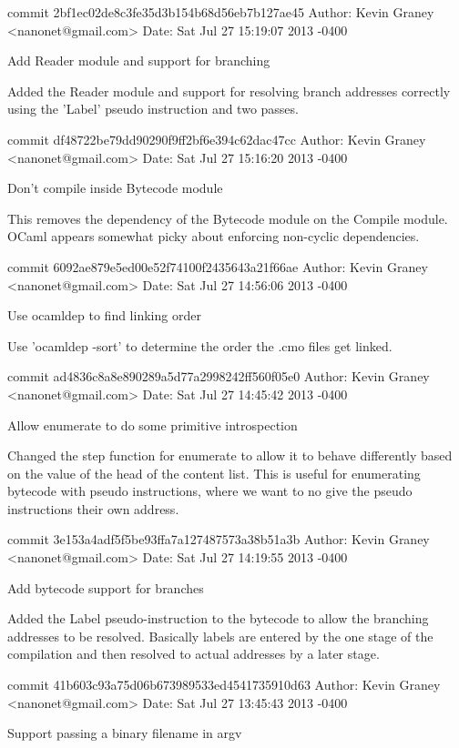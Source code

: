 commit 2bf1ec02de8c3fe35d3b154b68d56eb7b127ae45
Author: Kevin Graney <nanonet@gmail.com>
Date:   Sat Jul 27 15:19:07 2013 -0400

    Add Reader module and support for branching
    
    Added the Reader module and support for resolving branch addresses
    correctly using the 'Label' pseudo instruction and two passes.

commit df48722be79dd90290f9ff2bf6e394c62dac47cc
Author: Kevin Graney <nanonet@gmail.com>
Date:   Sat Jul 27 15:16:20 2013 -0400

    Don't compile inside Bytecode module
    
    This removes the dependency of the Bytecode module on the
    Compile module.  OCaml appears somewhat picky about enforcing
    non-cyclic dependencies.

commit 6092ae879e5ed00e52f74100f2435643a21f66ae
Author: Kevin Graney <nanonet@gmail.com>
Date:   Sat Jul 27 14:56:06 2013 -0400

    Use ocamldep to find linking order
    
    Use 'ocamldep -sort' to determine the order the .cmo files get
    linked.

commit ad4836c8a8e890289a5d77a2998242ff560f05e0
Author: Kevin Graney <nanonet@gmail.com>
Date:   Sat Jul 27 14:45:42 2013 -0400

    Allow enumerate to do some primitive introspection
    
    Changed the step function for enumerate to allow it to behave
    differently based on the value of the head of the content list.
    This is useful for enumerating bytecode with pseudo instructions,
    where we want to no give the pseudo instructions their own address.

commit 3e153a4adf5f5be93ffa7a127487573a38b51a3b
Author: Kevin Graney <nanonet@gmail.com>
Date:   Sat Jul 27 14:19:55 2013 -0400

    Add bytecode support for branches
    
    Added the Label pseudo-instruction to the bytecode to allow the
    branching addresses to be resolved.  Basically labels are entered
    by the one stage of the compilation and then resolved to actual
    addresses by a later stage.

commit 41b603c93a75d06b673989533ed4541735910d63
Author: Kevin Graney <nanonet@gmail.com>
Date:   Sat Jul 27 13:45:43 2013 -0400

    Support passing a binary filename in argv
    
